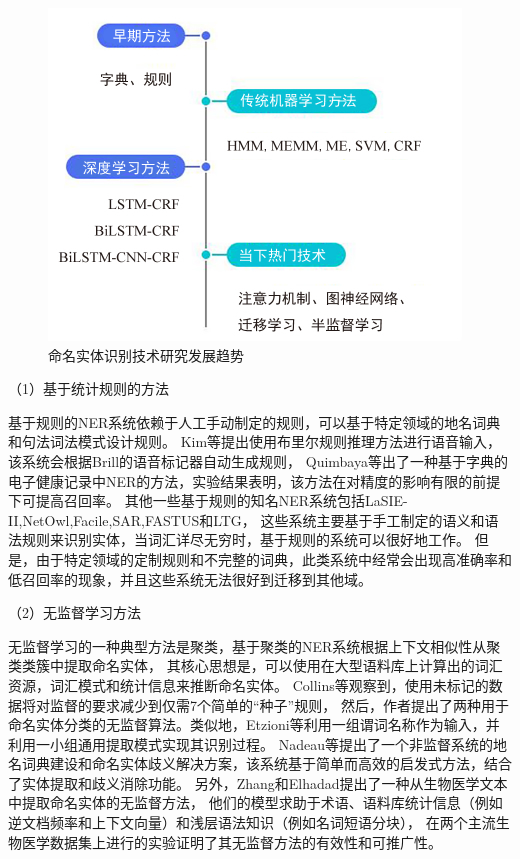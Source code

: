 \begin{figure}[htbp]
  \centering
  \includegraphics[scale=1]{./images/nerp.jpg}
  \caption{命名实体识别技术研究发展趋势\cite{nadeau2007survey}}
  \label{fig:nerp}
\end{figure}

（1）基于统计规则的方法

基于规则的NER系统依赖于人工手动制定的规则，可以基于特定领域的地名词典和句法词法模式设计规则。
Kim等提出使用布里尔规则推理方法进行语音输入，该系统会根据Brill的语音标记器自动生成规则\cite{kim2000rule}，
Quimbaya等出了一种基于字典的电子健康记录中NER的方法\cite{pomares2016named}，实验结果表明，该方法在对精度的影响有限的前提下可提高召回率。
其他一些基于规则的知名NER系统包括LaSIE-II,NetOwl,Facile,SAR,FASTUS和LTG，
这些系统主要基于手工制定的语义和语法规则来识别实体，当词汇详尽无穷时，基于规则的系统可以很好地工作。
但是，由于特定领域的定制规则和不完整的词典，此类系统中经常会出现高准确率和低召回率的现象，并且这些系统无法很好到迁移到其他域。

（2）无监督学习方法

无监督学习的一种典型方法是聚类，基于聚类的NER系统根据上下文相似性从聚类类簇中提取命名实体，
其核心思想是，可以使用在大型语料库上计算出的词汇资源，词汇模式和统计信息来推断命名实体。 
Collins等观察到，使用未标记的数据将对监督的要求减少到仅需7个简单的“种子”规则\cite{collins1999unsupervised}，
然后，作者提出了两种用于命名实体分类的无监督算法。类似地，Etzioni等利用一组谓词名称作为输入，并利用一小组通用提取模式实现其识别过程\cite{etzioni2005unsupervised}。 
Nadeau等提出了一个非监督系统的地名词典建设和命名实体歧义解决方案，该系统基于简单而高效的启发式方法，结合了实体提取和歧义消除功能\cite{nadeau2006unsupervised}。
另外，Zhang和Elhadad提出了一种从生物医学文本中提取命名实体的无监督方法\cite{zhang2013unsupervised}，
他们的模型求助于术语、语料库统计信息（例如逆文档频率和上下文向量）和浅层语法知识（例如名词短语分块），
在两个主流生物医学数据集上进行的实验证明了其无监督方法的有效性和可推广性。

